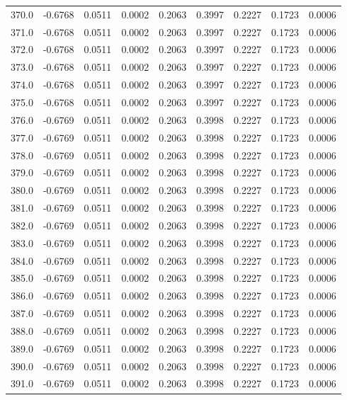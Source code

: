 \begin{longtable}{lrrrrrrrr}
370.0 & -0.6768 & 0.0511 & 0.0002 & 0.2063 & 0.3997 & 0.2227 & 0.1723 & 0.0006 \\
371.0 & -0.6768 & 0.0511 & 0.0002 & 0.2063 & 0.3997 & 0.2227 & 0.1723 & 0.0006 \\
372.0 & -0.6768 & 0.0511 & 0.0002 & 0.2063 & 0.3997 & 0.2227 & 0.1723 & 0.0006 \\
373.0 & -0.6768 & 0.0511 & 0.0002 & 0.2063 & 0.3997 & 0.2227 & 0.1723 & 0.0006 \\
374.0 & -0.6768 & 0.0511 & 0.0002 & 0.2063 & 0.3997 & 0.2227 & 0.1723 & 0.0006 \\
375.0 & -0.6768 & 0.0511 & 0.0002 & 0.2063 & 0.3997 & 0.2227 & 0.1723 & 0.0006 \\
376.0 & -0.6769 & 0.0511 & 0.0002 & 0.2063 & 0.3998 & 0.2227 & 0.1723 & 0.0006 \\
377.0 & -0.6769 & 0.0511 & 0.0002 & 0.2063 & 0.3998 & 0.2227 & 0.1723 & 0.0006 \\
378.0 & -0.6769 & 0.0511 & 0.0002 & 0.2063 & 0.3998 & 0.2227 & 0.1723 & 0.0006 \\
379.0 & -0.6769 & 0.0511 & 0.0002 & 0.2063 & 0.3998 & 0.2227 & 0.1723 & 0.0006 \\
380.0 & -0.6769 & 0.0511 & 0.0002 & 0.2063 & 0.3998 & 0.2227 & 0.1723 & 0.0006 \\
381.0 & -0.6769 & 0.0511 & 0.0002 & 0.2063 & 0.3998 & 0.2227 & 0.1723 & 0.0006 \\
382.0 & -0.6769 & 0.0511 & 0.0002 & 0.2063 & 0.3998 & 0.2227 & 0.1723 & 0.0006 \\
383.0 & -0.6769 & 0.0511 & 0.0002 & 0.2063 & 0.3998 & 0.2227 & 0.1723 & 0.0006 \\
384.0 & -0.6769 & 0.0511 & 0.0002 & 0.2063 & 0.3998 & 0.2227 & 0.1723 & 0.0006 \\
385.0 & -0.6769 & 0.0511 & 0.0002 & 0.2063 & 0.3998 & 0.2227 & 0.1723 & 0.0006 \\
386.0 & -0.6769 & 0.0511 & 0.0002 & 0.2063 & 0.3998 & 0.2227 & 0.1723 & 0.0006 \\
387.0 & -0.6769 & 0.0511 & 0.0002 & 0.2063 & 0.3998 & 0.2227 & 0.1723 & 0.0006 \\
388.0 & -0.6769 & 0.0511 & 0.0002 & 0.2063 & 0.3998 & 0.2227 & 0.1723 & 0.0006 \\
389.0 & -0.6769 & 0.0511 & 0.0002 & 0.2063 & 0.3998 & 0.2227 & 0.1723 & 0.0006 \\
390.0 & -0.6769 & 0.0511 & 0.0002 & 0.2063 & 0.3998 & 0.2227 & 0.1723 & 0.0006 \\
391.0 & -0.6769 & 0.0511 & 0.0002 & 0.2063 & 0.3998 & 0.2227 & 0.1723 & 0.0006 \\

\end{longtable}
